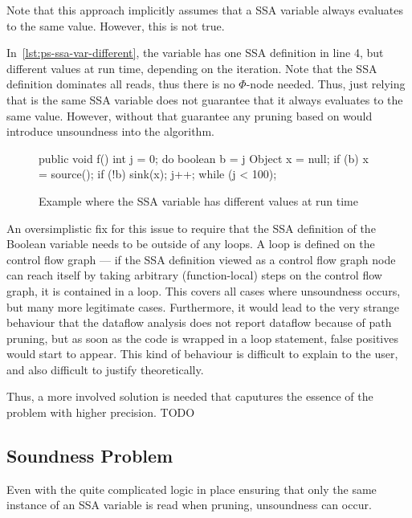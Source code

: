 Note that this approach implicitly assumes that a SSA variable always evaluates 
to the same value.
However, this is not true.

In~\autoref{lst:ps-ssa-var-different}, the variable  has one SSA definition 
in line 4, but different values at run time, depending on the iteration.
Note that the SSA definition dominates all reads, thus there is no $\Phi$-node
needed.
Thus, just relying that  is the same SSA variable does not guarantee 
that it always evaluates to the same value.
However, without that guarantee any pruning based on  would introduce 
unsoundness into the algorithm.

\begin{figure}
    \begin{javacode}
public void f() {
    int j = 0;
    do {
        boolean b = j %
        Object x = null;
        if (b) {
            x = source();
        }
        if (!b) {
            sink(x);
        }
        j++;
    } while (j < 100);
}
    \end{javacode}
    \caption{Example where the SSA variable  has different values at run time}
    \label{lst:ps-ssa-var-different}
\end{figure}

An oversimplistic fix for this issue to require that the SSA definition of the
Boolean variable needs to be outside of any loops.
A loop is defined on the control flow graph ---
if the SSA definition viewed as a control flow graph node can reach itself by taking
arbitrary (function-local) steps on the control flow graph, it is contained in a loop.
This covers all cases where unsoundness occurs, but many more legitimate cases.
Furthermore, it would lead to the very strange behaviour that the dataflow analysis 
does not report dataflow because of path pruning, but as soon as the code is 
wrapped in a loop statement, false positives would start to appear.
This kind of behaviour is difficult to explain to the user, and also difficult
to justify theoretically.

Thus, a more involved solution is needed that caputures the
essence of the problem with higher precision.
TODO


\subsection{Soundness Problem}
Even with the quite complicated logic in place ensuring that only the same 
instance of an SSA variable is read when pruning, unsoundness can occur.


